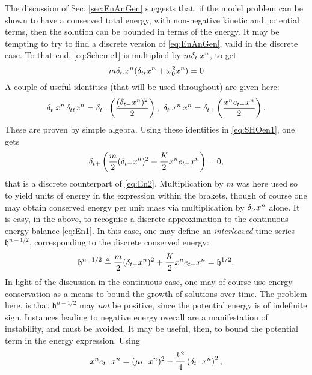 The discussion of Sec. \ref{sec:EnAnGen} suggests that, if the model problem can be shown to have a conserved total energy, with non-negative kinetic and potential terms, then the solution can be bounded in terms of the energy. It may be tempting to try to find a discrete version of \eqref{eq:EnAnGen}, valid in the discrete case. To that end, \eqref{eq:Scheme1} is multiplied by $m \delta_{t\cdot} x^n$, to get
\begin{equation}\label{eq:SHOen1}
    m \delta_{t\cdot} x^n (\delta_{tt} x^n +\omega_0^2 x^n) = 0
\end{equation}
A couple of useful identities (that will be used throughout) are given here:
\begin{equation}\label{eq:IdsFD}
    \delta_{t\cdot} x^n \, \delta_{tt} x^n = \delta_{t+} \left( \frac{(\delta_{t-} x^n)^2}{2}\right), \,\, \delta_{t\cdot} x^n \, x^n = \delta_{t+} \left( \frac{x^n e_{t-} x^n}{2}\right).
\end{equation}
These are proven by simple algebra. Using these identities in \eqref{eq:SHOen1}, one gets
\begin{equation}
    \delta_{t+} \left( \frac{m}{2}{(\delta_{t-} x^n)^2} + \frac{K}{2} {x^n e_{t-} x^n} \right) = 0,
\end{equation} 
that is a discrete counterpart of \eqref{eq:En2}. Multiplication by $m$ was here used so to yield units of energy in the expression within the brakets, though of course one may obtain conserved energy per unit mass via multiplication by $\delta_{t\cdot} x^n$ alone. It is easy, in the above, to recognise a discrete approximation to the continuous energy balance \eqref{eq:En1}. In this case, one may define an \emph{interleaved} time series $\mathfrak{h}^{n-1/2}$, corresponding to the discrete conserved energy:
\begin{equation}\label{eq:DiscEnSHO}
    \mathfrak{h}^{n-1/2} \triangleq \frac{m}{2}{(\delta_{t-} x^n)^2} + \frac{K}{2} {x^n e_{t-} x^n} = \mathfrak{h}^{1/2}.
\end{equation}
In light of the discussion in the continuous case, one may of course use energy conservation as a means to bound the growth of solutions over time. The problem here, is that $\mathfrak{h}^{n-1/2}$ may \emph{not} be positive, since the potential energy is of indefinite sign. Instances leading to negative energy overall are a manifestation of instability, and must be avoided. It may be useful, then, to bound the potential term in the energy expression. Using
\begin{equation}
    x^n e_{t-} x^n  =  (\mu_{t-} x^n)^2 - \frac{k^2}{4}\left(\delta_{t-} x^n \right)^2,
\end{equation}
